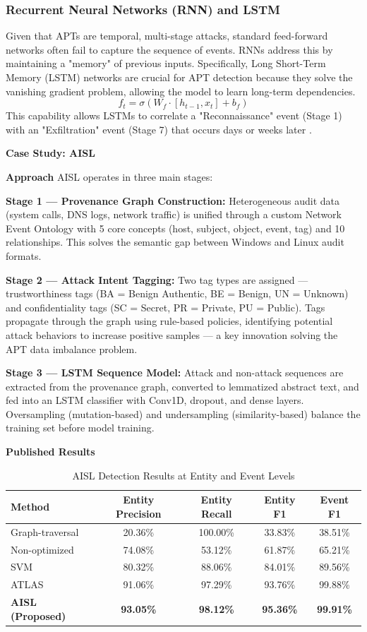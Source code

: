 \subsubsection{Recurrent Neural Networks (RNN) and LSTM}
Given that APTs are temporal, multi-stage attacks, standard feed-forward networks often fail to capture the sequence of events. RNNs address this by maintaining a "memory" of previous inputs. Specifically, Long Short-Term Memory (LSTM) networks are crucial for APT detection because they solve the vanishing gradient problem, allowing the model to learn long-term dependencies.
\begin{equation}
    f_t = \sigma(W_f \cdot [h_{t-1}, x_t] + b_f)
\end{equation}
This capability allows LSTMs to correlate a "Reconnaissance" event (Stage 1) with an "Exfiltration" event (Stage 7) that occurs days or weeks later \cite{ankalaki2025cyber}.

\textbf{Case Study: AISL \cite{yue2024aisl}}

\textbf{Approach}
AISL operates in three main stages:

\textbf{Stage 1 --- Provenance Graph Construction:} Heterogeneous audit data (system calls, DNS logs, network traffic) is unified through a custom Network Event Ontology with 5 core concepts (host, subject, object, event, tag) and 10 relationships. This solves the semantic gap between Windows and Linux audit formats.

\textbf{Stage 2 --- Attack Intent Tagging:} Two tag types are assigned --- trustworthiness tags (BA = Benign Authentic, BE = Benign, UN = Unknown) and confidentiality tags (SC = Secret, PR = Private, PU = Public). Tags propagate through the graph using rule-based policies, identifying potential attack behaviors to increase positive samples --- a key innovation solving the APT data imbalance problem.

\textbf{Stage 3 --- LSTM Sequence Model:} Attack and non-attack sequences are extracted from the provenance graph, converted to lemmatized abstract text, and fed into an LSTM classifier with Conv1D, dropout, and dense layers. Oversampling (mutation-based) and undersampling (similarity-based) balance the training set before model training.

\textbf{Published Results}
\begin{table}[H]
\centering
\caption{AISL Detection Results at Entity and Event Levels}
\begin{tabular}{|l|c|c|c|c|}
\hline
\textbf{Method} & \textbf{Entity Precision} & \textbf{Entity Recall} & \textbf{Entity F1} & \textbf{Event F1} \\
\hline
Graph-traversal & 20.36\% & 100.00\% & 33.83\% & 38.51\% \\
Non-optimized & 74.08\% & 53.12\% & 61.87\% & 65.21\% \\
SVM & 80.32\% & 88.06\% & 84.01\% & 89.56\% \\
ATLAS & 91.06\% & 97.29\% & 93.76\% & 99.88\% \\
\textbf{AISL (Proposed)} & \textbf{93.05\%} & \textbf{98.12\%} & \textbf{95.36\%} & \textbf{99.91\%} \\
\hline
\end{tabular}
\end{table}

